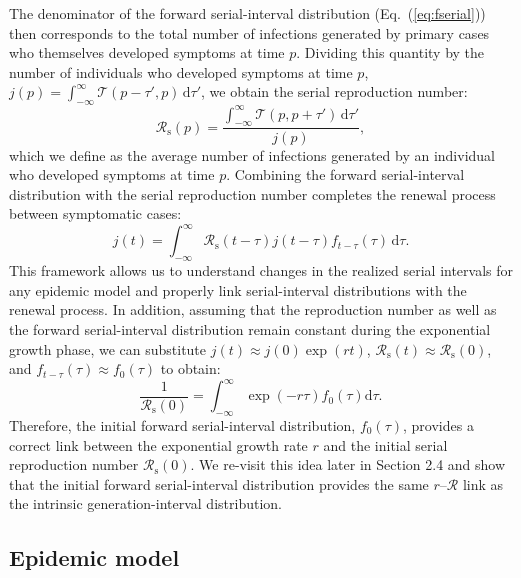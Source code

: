 \documentclass[12pt]{article}
\newcommand{\eref}[1]{Eq.~(\ref{eq:#1})}
\newcommand{\Rx}[1]{\ensuremath{{\mathcal R}_{#1}}\xspace}
\newcommand{\Rs}{\Rx{\mathrm{s}}}
\newcommand{\RR}{\ensuremath{{\mathcal R}}\xspace}
\newcommand{\dd}[1]{\ensuremath{\, \mathrm{d}#1}}
\newcommand{\dtau}{\dd{\tau}}
\newcommand{\psymp}{\ensuremath{p}} %
\newcommand{\total}{{\mathcal T}} %
\begin{document}
The denominator of the forward serial-interval distribution (\eref{fserial}) then corresponds to the total number of infections generated by primary cases who themselves developed symptoms at time \psymp.
Dividing this quantity by the number of individuals who developed symptoms at time \psymp, $j(\psymp) = \int_{-\infty}^\infty \total(\psymp-\tau', \psymp) \dtau'$, we obtain the serial reproduction number:
\begin{equation}
\Rs(\psymp) = \frac{\int_{-\infty}^\infty \total(\psymp, \psymp+\tau') \dtau'}{j(\psymp)},
\end{equation}
which we define as the average number of infections generated by an individual who developed symptoms at time \psymp.
Combining the forward serial-interval distribution with the serial reproduction number completes the renewal process between symptomatic cases:
\begin{equation}
j(t) = \int_{-\infty}^\infty \Rs(t-\tau) j(t-\tau) f_{t-\tau}(\tau) \dtau.
\label{eq:jrenew}
\end{equation}
This framework allows us to understand changes in the realized serial intervals for any epidemic model and properly link serial-interval distributions with the renewal process.
In addition,  assuming that the reproduction number as well as the forward serial-interval distribution remain constant during the exponential growth phase, we can substitute $j(t) \approx j(0) \exp(rt)$, $\Rs(t) \approx \Rs(0)$, and $f_{t-\tau}(\tau) \approx f_0(\tau)$ to obtain:
\begin{equation}
\frac{1}{\Rs(0)} = \int_{-\infty}^\infty \exp(-r\tau) f_{0}(\tau) \mathrm{d} \tau.
\label{eq:Rforward0}
\end{equation}
Therefore, the initial forward serial-interval distribution, $f_0(\tau)$, provides a correct link between the exponential growth rate $r$ and the initial serial reproduction number $\Rs(0)$.
We re-visit this idea later in Section 2.4 and show that the initial forward serial-interval distribution provides the same $r$--\RR link as the intrinsic generation-interval distribution.

\subsection{Epidemic model}
\end{document}
